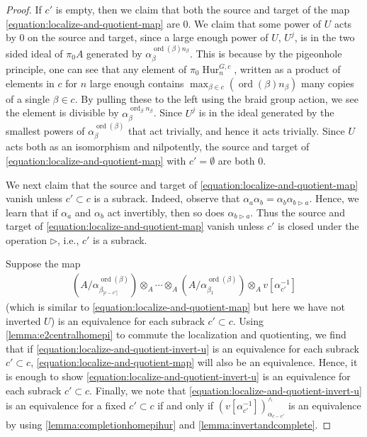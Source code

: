 \documentclass[12 pt]{amsart}
\theoremstyle{plain}
\theoremstyle{definition}
\theoremstyle{remark}
\numberwithin{equation}{section}
\DeclareMathOperator\Hur{Hur}
\DeclareMathOperator\ord{ord}
\begin{document}
\begin{proof}
	If $c'$ is empty, then we claim that both the source and target of the map 
	\eqref{equation:localize-and-quotient-map} 
	are $0$. 
	We claim that some power of $U$ acts by $0$ on the source and target, since a large
	enough power of $U$, $U^j$, is in the two sided ideal of $\pi_0A$ generated by
	$\alpha_{\beta}^{\ord(\beta)n_{\beta}}$. This is because by the
	pigeonhole principle, one can see that any element of
	$\pi_0\Hur^{G,c}_n$, written as a product of elements in $c$ for $n$
	large enough contains $\max_{\beta \in c}(\ord(\beta)n_{\beta})$ many copies of a single $\beta\in c$. By pulling these to the left using the braid group action, we see the element is divisible by $\alpha_{\beta}^{\ord_{\beta}n_{\beta}}$.
	Since $U^j$
	is in the ideal generated by the smallest powers of $\alpha_{\beta}^{\ord(\beta)}$ that act trivially, and hence it acts trivially.
	Since $U$ acts both as an isomorphism and nilpotently, the source and
	target of \eqref{equation:localize-and-quotient-map} with $c' =
	\emptyset$ are both $0$.
	
We next claim that 
the source and target of 
	\eqref{equation:localize-and-quotient-map}
	vanish unless $c' \subset c$ is a subrack.
	Indeed, observe that
	$\alpha_a\alpha_b=\alpha_b \alpha_{b \triangleright a}$. Hence, we learn that if $\alpha_a$ and $\alpha_b$ act
	invertibly, then so does $\alpha_{b \triangleright a}$. Thus the source and target of 
	\eqref{equation:localize-and-quotient-map}
	vanish unless $c'$ is closed under the operation $\triangleright$, i.e.,
	$c'$ is a subrack.

	Suppose the map
	\begin{align}
		\label{equation:localize-and-quotient-invert-u}
(A/\alpha^{\ord(\beta)}_{\beta_{|c-c'|}})\otimes_A\cdots \otimes_A
(A/\alpha^{\ord(\beta)}_{\beta_1})\otimes_Av[\alpha_{c'}^{-1}]
	\end{align}
	(which is similar to \eqref{equation:localize-and-quotient-map} but here
	we have not inverted $U$)
	is an equivalence for each subrack $c' \subset c$.
	Using \autoref{lemma:e2centralhomepi} to commute the
	localization and quotienting, we find that if
	\eqref{equation:localize-and-quotient-invert-u}
	is an equivalence for each
	subrack $c' \subset c$, \eqref{equation:localize-and-quotient-map} will also be an
	equivalence.
	Hence, it is enough to show
	\eqref{equation:localize-and-quotient-invert-u} is an equivalence
	for each subrack $c' \subset c$.
	Finally, we note that
	\eqref{equation:localize-and-quotient-invert-u} is an equivalence
	for a fixed $c' \subset c$ if and only if
	$(v[\alpha_{c'}^{-1}])^\wedge_{\alpha_{c-c'}}$ is an
	equivalence by
	using \autoref{lemma:completionhomepihur} and \autoref{lemma:invertandcomplete}.
	\end{proof}
\end{document}

